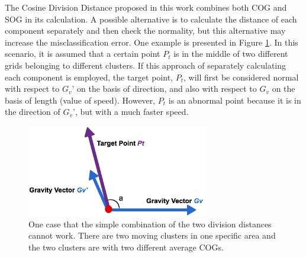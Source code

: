 \documentclass[12pt,glossary]{dalcsthesis}
\begin{document}
The Cosine Division Distance proposed in this work combines both COG and SOG in its calculation. A possible alternative is to calculate the distance of each component separately and then check the normality, but this alternative may increase the misclassification error. One example is presented in Figure \ref{fig:abnormal_cosine}. In this scenario, it is assumed that a certain point $P_t$ is in the middle of two different grids belonging to different clusters. If this approach of separately calculating each component is employed, the target point, $P_t$, will first be considered normal with respect to $G_v$' on the basis of direction, and also with respect to $G_v$ on the basis of length (value of speed).
However, $P_t$ is an abnormal point because it is in the direction of $G_v$', but with a much faster speed.

\begin{figure}[!htb]
\centering
\includegraphics[width=8cm]{cosine.png}
\caption{One case that the simple combination of the two division distances cannot work. There are two moving clusters in one specific area and the two clusters are with two different average COGs. }
\label{fig:abnormal_cosine}
\end{figure}
\end{document}
